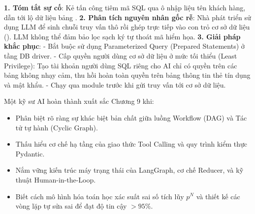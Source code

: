 \begin{debugbox}
\textbf{1. Tóm tắt sự cố}: Kẻ tấn công tiêm mã SQL qua ô nhập liệu tên khách hàng, dẫn tới lộ dữ liệu bảng .
\textbf{2. Phân tích nguyên nhân gốc rễ}:
Nhà phát triển sử dụng LLM để sinh chuỗi truy vấn thô rồi ghép trực tiếp vào con trỏ cơ sở dữ liệu (). LLM không thể đảm bảo lọc sạch ký tự thoát mã hiểm họa.
\textbf{3. Giải pháp khắc phục}:
- Bắt buộc sử dụng Parameterized Query (Prepared Statements) ở tầng DB driver.
- Cấp quyền người dùng cơ sở dữ liệu ở mức tối thiểu (Least Privilege): Tạo tài khoản người dùng SQL riêng cho AI chỉ có quyền  trên các bảng không nhạy cảm, thu hồi hoàn toàn quyền trên bảng thông tin thẻ tín dụng và mật khẩu.
- Chạy qua module  trước khi gửi truy vấn tới cơ sở dữ liệu.
\end{debugbox}

\begin{checkpointbox}
Một kỹ sư AI hoàn thành xuất sắc Chương 9 khi:
\begin{itemize}
  \item Phân biệt rõ ràng sự khác biệt bản chất giữa luồng Workflow (DAG) và Tác tử tự hành (Cyclic Graph).
  \item Thấu hiểu cơ chế hạ tầng của giao thức Tool Calling và quy trình kiểm thực Pydantic.
  \item Nắm vững kiến trúc máy trạng thái của LangGraph, cơ chế Reducer, và kỹ thuật Human-in-the-Loop.
  \item Biết cách mô hình hóa toán học xác suất sai số tích lũy $p^N$ và thiết kế các vòng lặp tự sửa sai để đạt độ tin cậy $>95\%$.
\end{itemize}
\end{checkpointbox}
